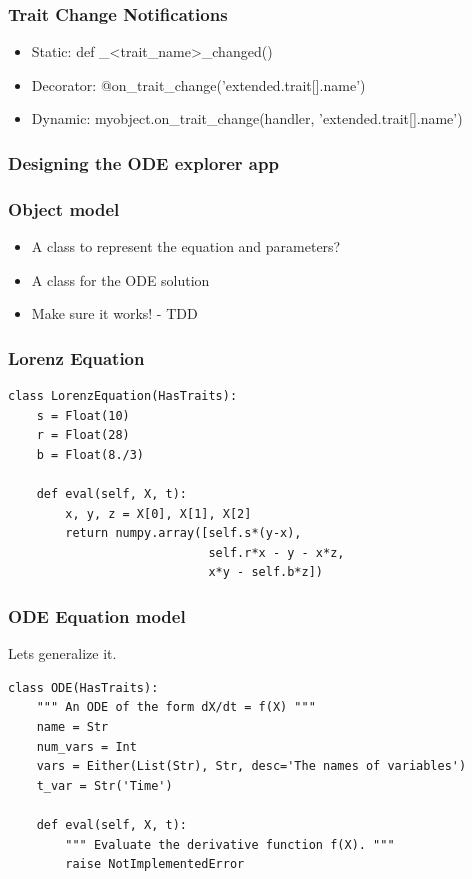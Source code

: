 \documentclass[14pt,compress]{beamer}
\newcommand{\myemph}[1]{\structure{\emph{#1}}}
\begin{document}
\begin{frame}
    \frametitle{Trait Change Notifications}
    \vspace*{-6pt}
    \small
    \begin{itemize}
        \item Static: def \_<trait\_name>\_changed()
        \item Decorator: @on\_trait\_change('extended.trait[].name')
        \item Dynamic: myobject.on\_trait\_change(handler, 'extended.trait[].name')
    \end{itemize}
\end{frame}


\begin{frame}
  \frametitle{Designing the ODE explorer app}
  \Large
\begin{center}
    \myemph{Think!}
\end{center}
\end{frame}

\begin{frame}
  \frametitle{Object model}
  \begin{itemize}
      \item A class to represent the equation and parameters?
      \item A class for the ODE solution
      \item Make sure it works! - TDD
 \end{itemize}
\end{frame}


\begin{frame}
    \frametitle{Lorenz Equation}
\scriptsize
\begin{lstlisting}
class LorenzEquation(HasTraits):
    s = Float(10)
    r = Float(28)
    b = Float(8./3)
    
    def eval(self, X, t):
        x, y, z = X[0], X[1], X[2]
        return numpy.array([self.s*(y-x),
                            self.r*x - y - x*z,
                            x*y - self.b*z])
\end{lstlisting}
\end{frame}


\begin{frame}
\frametitle{ODE Equation model}
Lets generalize it.
\scriptsize
\begin{lstlisting}
class ODE(HasTraits):
    """ An ODE of the form dX/dt = f(X) """
    name = Str
    num_vars = Int
    vars = Either(List(Str), Str, desc='The names of variables')
    t_var = Str('Time')

    def eval(self, X, t):
        """ Evaluate the derivative function f(X). """
        raise NotImplementedError
\end{lstlisting}
\end{frame}
\end{document}

